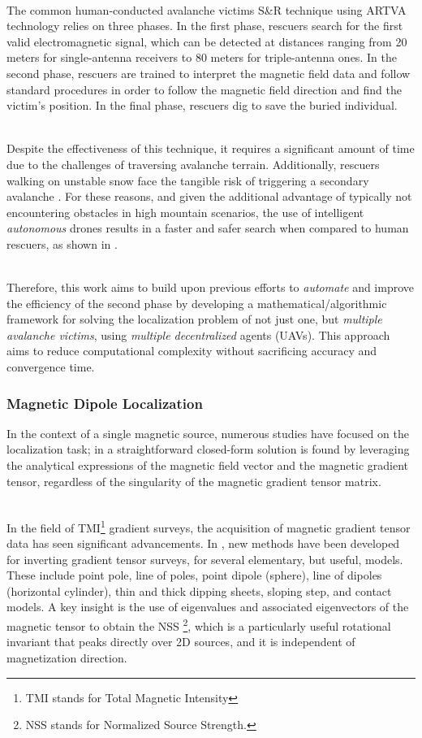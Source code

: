 \documentclass[main]{subfiles}
\begin{document}
\noindent\\The common human-conducted avalanche victims S\&R technique using ARTVA 
technology relies on three phases. In the first phase, rescuers search for the 
first valid electromagnetic signal, which can be detected at distances ranging 
from 20 meters for single-antenna receivers to 80 meters for triple-antenna ones. 
In the second phase, rescuers are trained to interpret the magnetic field data 
and follow standard procedures in order to follow the magnetic field direction and 
find the victim's position. In the final phase, rescuers dig to save the buried 
individual.

\noindent\\Despite the effectiveness of this technique, it requires a significant amount of 
time due to the challenges of traversing avalanche terrain. Additionally, 
rescuers walking on unstable snow face the tangible risk of triggering a 
secondary avalanche \cite{first-model}. For these reasons, and given the 
additional advantage of typically not encountering obstacles in high mountain 
scenarios, the use of intelligent \textit{autonomous} drones results in a faster 
and safer search when compared to human rescuers, as shown in \cite{sr, sr2, sr3}.

\noindent\\Therefore, this work aims to build upon previous efforts to 
\textit{automate} and improve the efficiency of the second phase by developing a 
mathematical/algorithmic framework for solving the localization problem of not 
just one, but \textit{multiple avalanche victims}, using \textit{multiple 
decentralized} agents (UAVs). This approach aims to reduce computational 
complexity without sacrificing accuracy and convergence time.

\subsubsection{Magnetic Dipole Localization}
In the context of a single magnetic source, numerous studies have focused 
on the localization task; in \cite{single_closed_formula_position} 
a straightforward closed-form solution is found by leveraging the analytical 
expressions of the magnetic field vector and the magnetic gradient tensor, 
regardless of the singularity of the magnetic gradient tensor matrix.

\noindent\\In the field of TMI\footnote{TMI stands for Total Magnetic Intensity} 
gradient surveys, the acquisition of magnetic gradient tensor data 
has seen significant advancements.
In \cite{NSS_analysis2}, new methods have been 
developed for inverting gradient tensor surveys, 
for several elementary, but useful, models. 
These include point pole, line 
of poles, point dipole (sphere), line of dipoles (horizontal cylinder), thin and thick 
dipping sheets, sloping step, and contact models.
A key insight is the use of eigenvalues and associated eigenvectors of the magnetic
tensor to obtain the NSS \footnote{NSS stands for Normalized Source Strength.},
which is a particularly useful rotational invariant that peaks 
directly over 2D sources, and it is independent of magnetization 
direction.
\end{document}
